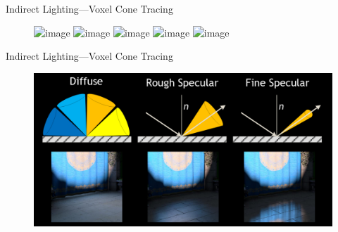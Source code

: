 \documentclass[10pt]{beamer}
\begin{document}
{
\begin{frame}{Indirect Lighting---Voxel Cone Tracing}




  \begin{figure}
    \includegraphics<+>[width=0.9\textwidth]{conetrace1}
    \includegraphics<+>[width=0.9\textwidth]{conetrace2}
    \includegraphics<+>[width=0.9\textwidth]{conetrace3}
    \includegraphics<+>[width=0.9\textwidth]{conetrace4}
    \includegraphics<+>[width=0.9\textwidth]{conetrace5}
  \end{figure}
\end{frame}}

{
\begin{frame}{Indirect Lighting---Voxel Cone Tracing}
  \begin{figure}
    \includegraphics[width=\textwidth]{coneangles}
  \end{figure}
\end{frame}}
\end{document}
